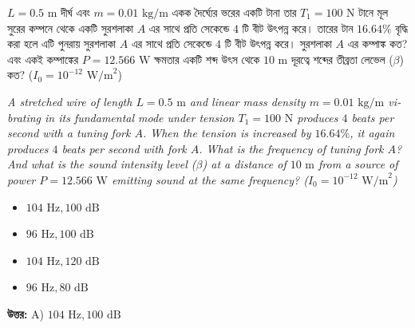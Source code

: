 \documentclass[12pt, a4paper]{article}
\begin{document}
\vspace{2em}
\begin{tcolorbox}[questionbox={প্রশ্ন (Question) 16}]
    \noindent
    $L = 0.5\text{ m}$ দীর্ঘ এবং $m = 0.01\text{ kg/m}$ একক দৈর্ঘ্যের ভরের একটি টানা তার $T_1 = 100\text{ N}$ টানে মূল সুরের কম্পনে থেকে একটি সুরশলাকা $A$ এর সাথে প্রতি সেকেন্ডে $4$ টি বীট উৎপন্ন করে। তারের টান $16.64\%$ বৃদ্ধি করা হলে এটি পুনরায় সুরশলাকা $A$ এর সাথে প্রতি সেকেন্ডে $4$ টি বীট উৎপন্ন করে। সুরশলাকা $A$ এর কম্পাঙ্ক কত? এবং একই কম্পাঙ্কের $P = 12.566\text{ W}$ ক্ষমতার একটি শব্দ উৎস থেকে $10\text{ m}$ দূরত্বে শব্দের তীব্রতা লেভেল ($\beta$) কত? ($I_0 = 10^{-12}\text{ W/m}^2$)
    
    \vspace{0.8em}
    \begin{english}
    \noindent\textit{\color{darkgray}
    A stretched wire of length $L = 0.5\text{ m}$ and linear mass density $m = 0.01\text{ kg/m}$ vibrating in its fundamental mode under tension $T_1 = 100\text{ N}$ produces $4$ beats per second with a tuning fork $A$. When the tension is increased by $16.64\%$, it again produces $4$ beats per second with fork $A$. What is the frequency of tuning fork $A$? And what is the sound intensity level ($\beta$) at a distance of $10\text{ m}$ from a source of power $P = 12.566\text{ W}$ emitting sound at the same frequency? ($I_0 = 10^{-12}\text{ W/m}^2$)
    }
    \end{english}
\end{tcolorbox}

\begin{itemize}[label={}, leftmargin=1cm, itemsep=0.5em]
    \item[\textbf{A)}] $104\text{ Hz}, 100\text{ dB}$
    \item[\textbf{B)}] $96\text{ Hz}, 100\text{ dB}$
    \item[\textbf{C)}] $104\text{ Hz}, 120\text{ dB}$
    \item[\textbf{D)}] $96\text{ Hz}, 80\text{ dB}$
\end{itemize}

\vspace{0.5em}
\begin{tcolorbox}[answerbox]
    \textbf{\color{success} উত্তর:} A) $104\text{ Hz}, 100\text{ dB}$
\end{tcolorbox}
\vspace{1em}
\end{document}
